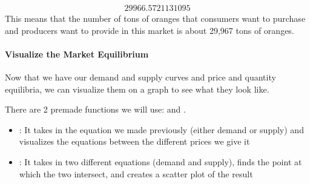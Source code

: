 \documentclass[letterpaper,10pt,english]{jupyterBook}
\begin{document}
\begin{sphinxVerbatim}[commandchars=\\\{\}]
 
 
\end{sphinxVerbatim}
\begin{equation*}
\begin{split}\displaystyle 29966.5721131095\end{split}
\end{equation*}
\sphinxAtStartPar
This means that the number of tons of oranges that consumers want to purchase and producers want to provide in this market is about 29,967 tons of oranges.


\paragraph{Visualize the Market Equilibrium}
\label{\detokenize{content/02-supply/03-market-equilibria:visualize-the-market-equilibrium}}
\sphinxAtStartPar
Now that we have our demand and supply curves and price and quantity equilibria, we can visualize them on a graph to see what they look like.

\sphinxAtStartPar
There are 2 pre\sphinxhyphen{}made functions we will use:  and .
\begin{itemize}
\item {} 
\sphinxAtStartPar
{}: It takes in the equation we made previously (either demand or supply) and visualizes the equations between the different prices we give it

\item {} 
\sphinxAtStartPar
{}: It takes in two different equations (demand and supply), finds the point at which the two intersect, and creates a scatter plot of the result

\end{itemize}
\end{document}
